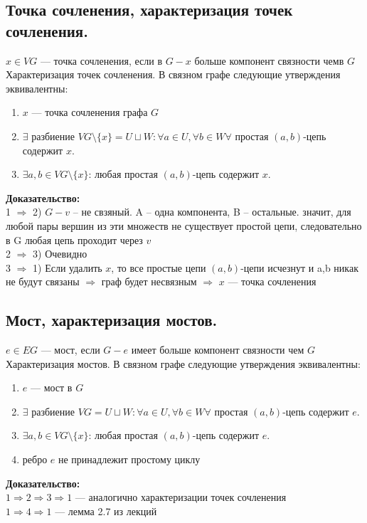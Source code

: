\documentclass[12pt]{article}
\begin{document}
\subsection{Точка сочленения, характеризация точек сочленения.}
	$x \in VG$ — точка сочленения, если в $G - x$ больше компонент связности чемв $G$\\
	Характеризация точек сочленения. В связном графе следующие утверждения эквивалентны:
	\begin{enumerate}
		\item $x$ — точка сочленения графа $G$
		\item $\exists$ разбиение $VG \setminus \{x\} = U \sqcup W: \forall a \in U, \forall b \in W \forall$ простая $(a,b)$-цепь содержит $x$.
		\item $\exists a,b \in VG \setminus \{x\}$: любая простая $(a,b)$-цепь содержит $x$.
	\end{enumerate}
	\textbf{Доказательство:}\\
		1 $\Rightarrow$ 2) $G - v$ – не свзяный. A – одна компонента, B – остальные. значит, для любой пары вершин из эти множеств
не существует простой цепи, следовательно в G любая цепь проходит через $v$\\
		2 $\Rightarrow$ 3) Очевидно\\
		3 $\Rightarrow$ 1) Если удалить $x$, то все простые цепи $(a,b)$-цепи исчезнут и a,b никак не будут связаны $\Rightarrow$ граф будет несвязным $\Rightarrow$ $x$ — точка сочленения\\
	\qedsymbol
\subsection{Мост, характеризация мостов.}
	$e \in EG$ — мост, если $G-e$ имеет больше компонент связности чем $G$\\
	Характеризация мостов. В связном графе следующие утверждения эквивалентны:\\
		\begin{enumerate}
		\item $e$ — мост в $G$
		\item $\exists$ разбиение $VG = U \sqcup W: \forall a \in U, \forall b \in W \forall$ простая $(a,b)$-цепь содержит $e$.
		\item $\exists a,b \in VG \setminus \{x\}$: любая простая $(a,b)$-цепь содержит $e$.
		\item ребро $e$ не принадлежит простому циклу
	\end{enumerate}
	\textbf{Доказательство:}\\
		$1 \Rightarrow2\Rightarrow3\Rightarrow1$ — аналогично характеризации точек сочленения\\
		$1\Rightarrow4\Rightarrow1$ — лемма 2.7 из лекций\\
	\qedsymbol
\end{document}
